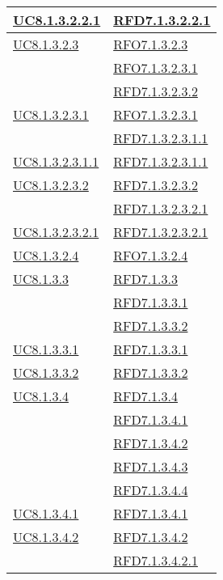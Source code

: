 \begin{longtable}{|>{\centering}m{5cm}|m{5cm}<{\centering}|}
\hyperref[UC8.1.3.2.2.1]{UC8.1.3.2.2.1} & \hyperlink{RFD7.1.3.2.2.1}{RFD7.1.3.2.2.1}\\ \hline
\hyperref[UC8.1.3.2.3]{UC8.1.3.2.3} & \hyperlink{RFO7.1.3.2.3}{RFO7.1.3.2.3}\\
& \hyperlink{RFO7.1.3.2.3.1}{RFO7.1.3.2.3.1}\\
& \hyperlink{RFD7.1.3.2.3.2}{RFD7.1.3.2.3.2}\\ \hline
\hyperref[UC8.1.3.2.3.1]{UC8.1.3.2.3.1} & \hyperlink{RFO7.1.3.2.3.1}{RFO7.1.3.2.3.1}\\
& \hyperlink{RFD7.1.3.2.3.1.1}{RFD7.1.3.2.3.1.1}\\ \hline
\hyperref[UC8.1.3.2.3.1.1]{UC8.1.3.2.3.1.1} & \hyperlink{RFD7.1.3.2.3.1.1}{RFD7.1.3.2.3.1.1}\\ \hline
\hyperref[UC8.1.3.2.3.2]{UC8.1.3.2.3.2} & \hyperlink{RFD7.1.3.2.3.2}{RFD7.1.3.2.3.2}\\
& \hyperlink{RFD7.1.3.2.3.2.1}{RFD7.1.3.2.3.2.1}\\ \hline
\hyperref[UC8.1.3.2.3.2.1]{UC8.1.3.2.3.2.1} & \hyperlink{RFD7.1.3.2.3.2.1}{RFD7.1.3.2.3.2.1}\\ \hline
\hyperref[UC8.1.3.2.4]{UC8.1.3.2.4} & \hyperlink{RFO7.1.3.2.4}{RFO7.1.3.2.4}\\ \hline
\hyperref[UC8.1.3.3]{UC8.1.3.3} & \hyperlink{RFD7.1.3.3}{RFD7.1.3.3}\\
& \hyperlink{RFD7.1.3.3.1}{RFD7.1.3.3.1}\\
& \hyperlink{RFD7.1.3.3.2}{RFD7.1.3.3.2}\\ \hline
\hyperref[UC8.1.3.3.1]{UC8.1.3.3.1} & \hyperlink{RFD7.1.3.3.1}{RFD7.1.3.3.1}\\ \hline
\hyperref[UC8.1.3.3.2]{UC8.1.3.3.2} & \hyperlink{RFD7.1.3.3.2}{RFD7.1.3.3.2}\\ \hline
\hyperref[UC8.1.3.4]{UC8.1.3.4} & \hyperlink{RFD7.1.3.4}{RFD7.1.3.4}\\
& \hyperlink{RFD7.1.3.4.1}{RFD7.1.3.4.1}\\
& \hyperlink{RFD7.1.3.4.2}{RFD7.1.3.4.2}\\
& \hyperlink{RFD7.1.3.4.3}{RFD7.1.3.4.3}\\
& \hyperlink{RFD7.1.3.4.4}{RFD7.1.3.4.4}\\ \hline
\hyperref[UC8.1.3.4.1]{UC8.1.3.4.1} & \hyperlink{RFD7.1.3.4.1}{RFD7.1.3.4.1}\\ \hline
\hyperref[UC8.1.3.4.2]{UC8.1.3.4.2} & \hyperlink{RFD7.1.3.4.2}{RFD7.1.3.4.2}\\
& \hyperlink{RFD7.1.3.4.2.1}{RFD7.1.3.4.2.1}\\

\end{longtable}
